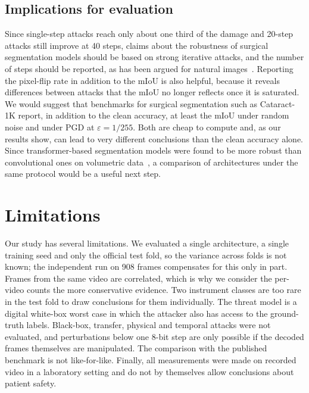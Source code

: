 \documentclass[conference]{IEEEtran}
\newcommand{\eps}{\varepsilon}
\begin{document}
\subsection{Implications for evaluation}
Since single-step attacks reach only about one third of the damage and 20-step attacks still improve at 40 steps, claims about the robustness of surgical segmentation models should be based on strong iterative attacks, and the number of steps should be reported, as has been argued for natural images~\cite{croce2023reliable,athalye2018obfuscated}. Reporting the pixel-flip rate in addition to the mIoU is also helpful, because it reveals differences between attacks that the mIoU no longer reflects once it is saturated. We would suggest that benchmarks for surgical segmentation such as Cataract-1K report, in addition to the clean accuracy, at least the mIoU under random noise and under PGD at $\eps=1/255$. Both are cheap to compute and, as our results show, can lead to very different conclusions than the clean accuracy alone. Since transformer-based segmentation models were found to be more robust than convolutional ones on volumetric data~\cite{malik2024evaluating}, a comparison of architectures under the same protocol would be a useful next step.

\section{Limitations}
Our study has several limitations. We evaluated a single architecture, a single training seed and only the official test fold, so the variance across folds is not known; the independent run on 908 frames compensates for this only in part. Frames from the same video are correlated, which is why we consider the per-video counts the more conservative evidence. Two instrument classes are too rare in the test fold to draw conclusions for them individually. The threat model is a digital white-box worst case in which the attacker also has access to the ground-truth labels. Black-box, transfer, physical and temporal attacks were not evaluated, and perturbations below one 8-bit step are only possible if the decoded frames themselves are manipulated. The comparison with the published benchmark is not like-for-like. Finally, all measurements were made on recorded video in a laboratory setting and do not by themselves allow conclusions about patient safety.

\end{document}
